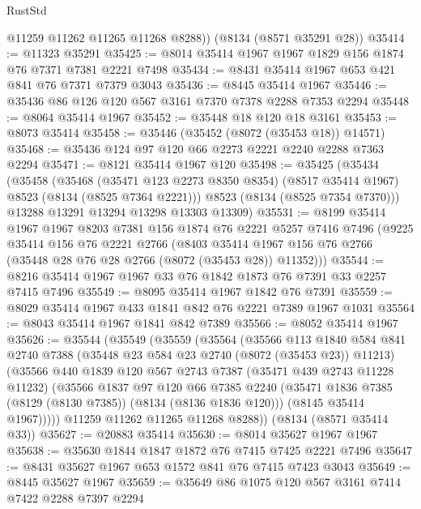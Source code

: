 \begin{lexlean}{RustStd}
\begin{coremodule}
        @11259
        @11262
        @11265
        @11268
        @8288))
    (@8134 (@8571 @35291 @28))
@35414 := @11323 @35291
@35425 := @8014 @35414 @1967 @1967 @1829 @156 @1874 @76 @7371 @7381 @2221 @7498
@35434 := @8431 @35414 @1967 @653 @421 @841 @76 @7371 @7379 @3043
@35436 := @8445 @35414 @1967
@35446 := @35436 @86 @126 @120 @567 @3161 @7370 @7378 @2288 @7353 @2294
@35448 := @8064 @35414 @1967
@35452 := @35448 @18 @120 @18 @3161
@35453 := @8073 @35414
@35458 := @35446 (@35452 (@8072 (@35453 @18)) @14571)
@35468 := @35436 @124 @97 @120 @66 @2273 @2221 @2240 @2288 @7363 @2294
@35471 := @8121 @35414 @1967 @120
@35498 := @35425
    (@35434
      (@35458
        (@35468
          (@35471 @123 @2273 @8350 @8354)
          (@8517 @35414 @1967)
          @8523
          (@8134 (@8525 @7364 @2221)))
        @8523
        (@8134 (@8525 @7354 @7370)))
      @13288
      @13291
      @13294
      @13298
      @13303
      @13309)
@35531 := @8199
    @35414
    @1967
    @1967
    @8203
    @7381
    @156
    @1874
    @76
    @2221
    @5257
    @7416
    @7496
    (@9225
      @35414
      @156
      @76
      @2221
      @2766
      (@8403 @35414 @1967 @156 @76 @2766 (@35448 @28 @76 @28 @2766 (@8072 (@35453 @28)) @11352)))
@35544 := @8216 @35414 @1967 @1967 @33 @76 @1842 @1873 @76 @7391 @33 @2257 @7415 @7496
@35549 := @8095 @35414 @1967 @1842 @76 @7391
@35559 := @8029 @35414 @1967 @433 @1841 @842 @76 @2221 @7389 @1967 @1031
@35564 := @8043 @35414 @1967 @1841 @842 @7389
@35566 := @8052 @35414 @1967
@35626 := @35544
    (@35549
      (@35559
        (@35564
          (@35566
            @113
            @1840
            @584
            @841
            @2740
            @7388
            (@35448 @23 @584 @23 @2740 (@8072 (@35453 @23)) @11213)
            (@35566
              @440
              @1839
              @120
              @567
              @2743
              @7387
              (@35471 @439 @2743 @11228 @11232)
              (@35566
                @1837
                @97
                @120
                @66
                @7385
                @2240
                (@35471 @1836 @7385 (@8129 (@8130 @7385)) (@8134 (@8136 @1836 @120)))
                (@8145 @35414 @1967)))))
        @11259
        @11262
        @11265
        @11268
        @8288))
    (@8134 (@8571 @35414 @33))
@35627 := @20883 @35414
@35630 := @8014 @35627 @1967 @1967
@35638 := @35630 @1844 @1847 @1872 @76 @7415 @7425 @2221 @7496
@35647 := @8431 @35627 @1967 @653 @1572 @841 @76 @7415 @7423 @3043
@35649 := @8445 @35627 @1967
@35659 := @35649 @86 @1075 @120 @567 @3161 @7414 @7422 @2288 @7397 @2294

\end{coremodule}
\end{lexlean}
